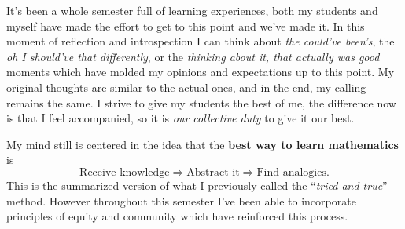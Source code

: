 \documentclass[a4paper,12pt,final]{book}
\begin{document}
It's been a whole semester full of learning experiences, both my students and myself have made the effort to get to this point and we've made it. In this moment of reflection and introspection I can think about \emph{the could've been's}, the \emph{oh I should've that differently}, or the \emph{thinking about it, that actually was good} moments which have molded my opinions and expectations up to this point. My original thoughts are similar to the actual ones, and in the end, my calling remains the same. I strive to give my students the best of me, the difference now is that I feel accompanied, so it is \emph{our collective duty} to give it our best.\par 
My mind still is centered in the idea that the \textbf{best way to learn mathematics }is 
$$\text{Receive knowledge}\Rightarrow\text{Abstract it}\Rightarrow\text{Find analogies}.$$
This is the summarized version of what I previously called the ``\emph{tried and true}'' method. However throughout this semester I've been able to incorporate principles of equity and community which have reinforced this process.
\end{document}
